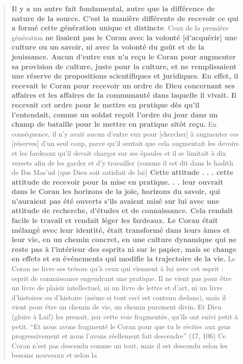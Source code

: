 \begin{quote}
\textbf{Il y a un autre fait fondamental, autre que la différence de
nature de la source. C'est la manière différente de recevoir ce qui a
formé cette génération unique et distincte}. Ceux de la première
génération \textbf{ne lisaient pas le Coran avec la volonté
{[}d'acquérir{]} une culture ou un savoir, ni avec la volonté du goût et
de la jouissance. Aucun d'entre eux n'a reçu le Coran pour augmenter sa
provision de culture, juste pour la culture, et ne remplissaient une
réserve de propositions scientifiques et juridiques. En effet, il
recevait le Coran pour recevoir un ordre de Dieu concernant ses affaires
et les affaires de la communauté dans laquelle il vivait. Il recevait
cet ordre pour le mettre en pratique dès qu'il l'entendait, comme un
soldat reçoit l'ordre du jour dans un champ de bataille pour le mettre
en pratique sitôt reçu.} En conséquence, il n'y avait aucun d'entre eux
pour {[}chercher{]} à augmenter ces {[}réserves{]} d'un seul coup, parce
qu'il sentait que cela augmentait les devoirs et les fardeaux qu'il
devait charger sur ses épaules et il se limitait à dix versets afin de
les garder et d'y travailler (comme il est dit dans le hadith de Ibn
Mas'ud (que Dieu soit satisfait de lui) \textbf{Cette attitude . . .
cette attitude de recevoir pour la mise en pratique. . . leur ouvrait
dans le Coran les horizons de la joie, horizons du savoir, qui
n'auraient pas été ouverts s'ils avaient misé sur lui avec une attitude
de recherche, d'études et de connaissance. Cela rendait facile le
travail et rendait léger les fardeaux. Le Coran était mélangé avec leur
identité, était transformé dans leurs âmes et leur vie, en un chemin
concret, en une culture dynamique qui ne reste pas à l'intérieur des
esprits ni sur le papier, mais se change en effets et en événements qui
modifie la trajectoire de la vie.} Le Coran ne livre ses trésors qu'à
ceux qui viennent à lui avec cet esprit : esprit de connaissance
engendrant une pratique. Il ne vient pas pour être un livre de plaisir
intellectuel, ni un livre de lettre et d'art, ni un livre d'histoires ou
d'histoire (même si tout ceci est contenu dedans), mais il vient pour
être un chemin de vie, un chemin purement divin. Et Dieu (gloire à Lui!)
les prenait, par cette voie fragmentée, qu'ils ont suivi petit à petit.
``Et nous avons fragmenté le Coran pour que tu le récites aux gens
progressivement et nous l'avons réellement fait descendre'' (17, 106) Ce
Coran n'est pas descendu comme un tout, mais il est descendu selon les
besoins nouveaux et selon la


\end{quote}

